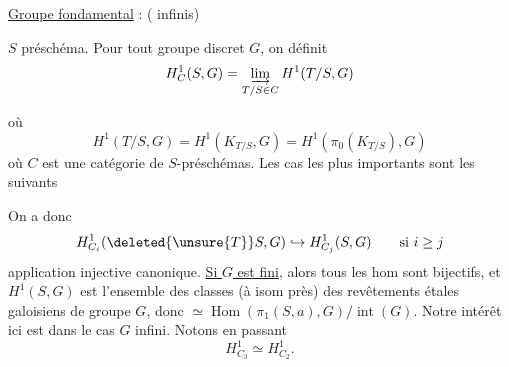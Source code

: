 \uline{Groupe fondamental} : ( infinis)

$S$ préschéma. Pour tout groupe discret $G$, on définit
\[
H^1_C(S,G)=\varinjlim_{T/S\in C}H^1(T/S,G)
\]
\quad
{}

où
\[
H^1(T/S,G)=H^1(K_{T/S},G)=H^1(\pi_0(K_{T/S}),G)
\]
où $C$ est une catégorie de $S$-préschémas.
Les cas les plus importants sont les suivants


On a donc
\[
H^1_{C_i}(\deleted{\unsure{T}}S,G)\hookrightarrow H^1_{C_j}(S,G)\qquad\text{si }i\geq j
\]
application injective canonique. \uline{Si $G$ est fini}, alors tous les hom sont bijectifs, et $H^1(S,G)$ est l'ensemble des classes (à isom près) des revêtements étales galoisiens de groupe $G$, donc $\simeq\operatorname{Hom}(\pi_1(S,a),G)/\operatorname{int}(G)$. Notre intérêt ici est dans le cas $G$ infini. Notons en passant
\[
H^1_{C_3}\simeq H^1_{C_2}.
\]

